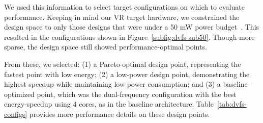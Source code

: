 We used this information to select target configurations on which to evaluate \nameArch performance.
Keeping in mind our VR target hardware, we constrained the design space to only those designs that were under a 50 mW power budget~\cite{tikekar18ijssc}.
This resulted in the configurations shown in Figure~\ref{subfig:dvfs-sub50}.
Though more sparse, the design space still showed performance-optimal points.

\dvfsConfigTable

From these, we selected: (1) a Pareto-optimal design point, representing the fastest point with low energy; (2) a low-power design point, demonstrating the highest speedup while maintaining low power consumption; and (3) a baseline-optimized point, which was the dual-frequency configuration with the best energy-speedup using 4 cores, as in the baseline architecture.
Table~\ref{tab:dvfs-configs} provides more performance details on these design points.
